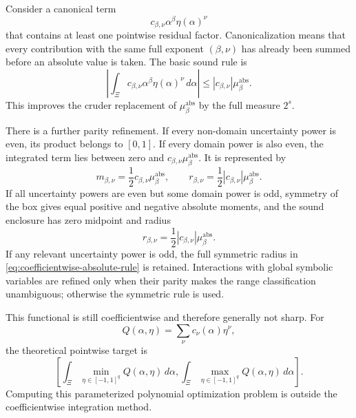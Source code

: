 \documentclass[11pt]{article}
\newcommand{\abs}[1]{\left\lvert #1\right\rvert}
\begin{document}
Consider a canonical term
\[
    c_{\beta,\nu}\alpha^\beta\eta(\alpha)^\nu
\]
that contains at least one pointwise residual factor.  Canonicalization means
that every contribution with the same full exponent \((\beta,\nu)\) has
already been summed before an absolute value is taken.  The basic sound rule is
\begin{equation}
 \left|\int_\Xi
 c_{\beta,\nu}\alpha^\beta\eta(\alpha)^\nu\,d\alpha\right|
 \leq
 \abs{c_{\beta,\nu}}\mu^{\mathrm{abs}}_\beta.
 \label{eq:coefficientwise-absolute-rule}
\end{equation}
This improves the cruder replacement of
\(\mu^{\mathrm{abs}}_\beta\) by the full measure \(2^s\).

There is a further parity refinement.  If every non-domain uncertainty power
is even, its product belongs to \([0,1]\).  If every domain power is also even,
the integrated term lies between zero and
\(c_{\beta,\nu}\mu^{\mathrm{abs}}_\beta\).  It is represented by
\begin{equation}
 m_{\beta,\nu}=\frac12c_{\beta,\nu}\mu^{\mathrm{abs}}_\beta,
 \qquad
 r_{\beta,\nu}=\frac12\abs{c_{\beta,\nu}}\mu^{\mathrm{abs}}_\beta.
 \label{eq:even-pointwise-midpoint-radius}
\end{equation}
If all uncertainty powers are even but some domain power is odd, symmetry of
the box gives equal positive and negative absolute moments, and the sound
enclosure has zero midpoint and radius
\begin{equation}
 r_{\beta,\nu}=\frac12\abs{c_{\beta,\nu}}
 \mu^{\mathrm{abs}}_\beta.
 \label{eq:odd-domain-even-noise-radius}
\end{equation}
If any relevant uncertainty power is odd, the full symmetric radius in
\eqref{eq:coefficientwise-absolute-rule} is retained.  Interactions with
global symbolic variables are refined only when their parity makes the range
classification unambiguous; otherwise the symmetric rule is used.

This functional is still coefficientwise and therefore generally not sharp.
For
\[
 Q(\alpha,\eta)=\sum_\nu c_\nu(\alpha)\eta^\nu,
\]
the theoretical pointwise target is
\begin{equation}
 \left[
 \int_\Xi\min_{\eta\in[-1,1]^q}Q(\alpha,\eta)\,d\alpha,
 \int_\Xi\max_{\eta\in[-1,1]^q}Q(\alpha,\eta)\,d\alpha
 \right].
 \label{eq:sharp-pointwise-target}
\end{equation}
Computing this parameterized polynomial optimization problem is outside the
coefficientwise integration method.
\end{document}
